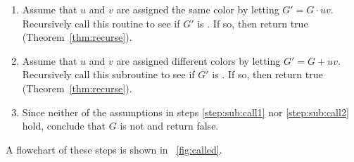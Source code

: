\begin{enumerate}
\item \label{step:sub:call1} Assume that \(u\) and \(v\) are assigned the same color by letting \(G'=G\cdot uv\).
  Recursively call this routine to see if \(G'\) is .  If so, then return true
  (Theorem~\ref{thm:recurse}).

\item \label{step:sub:call2} Assume that \(u\) and \(v\) are assigned different colors by letting \(G'=G+uv\).
  Recursively call this subroutine to see if \(G'\) is .  If so, then return true
  (Theorem~\ref{thm:recurse}).

\item \label{step:sub:fail} Since neither of the assumptions in steps \ref{step:sub:call1} nor \ref{step:sub:call2}
  hold, conclude that \(G\) is not  and return false.
\end{enumerate}

A flowchart of these steps is shown in \figurename~\ref{fig:called}.


